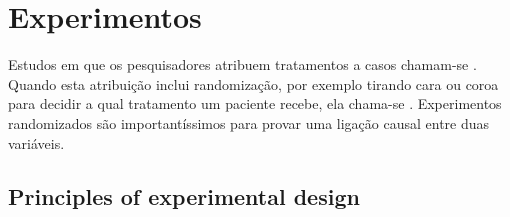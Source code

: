 
\section[Experimentos]{Experimentos }
\label{experimentsSection}

Estudos em que os pesquisadores atribuem tratamentos a casos chamam-se .
Quando esta atribuição inclui randomização, por exemplo tirando cara ou coroa para decidir a qual tratamento um paciente recebe, ela chama-se .
Experimentos randomizados são importantíssimos para provar uma ligação causal entre duas variáveis.

\subsection{Principles of experimental design}
\label{experimentalDesignPrinciples}

